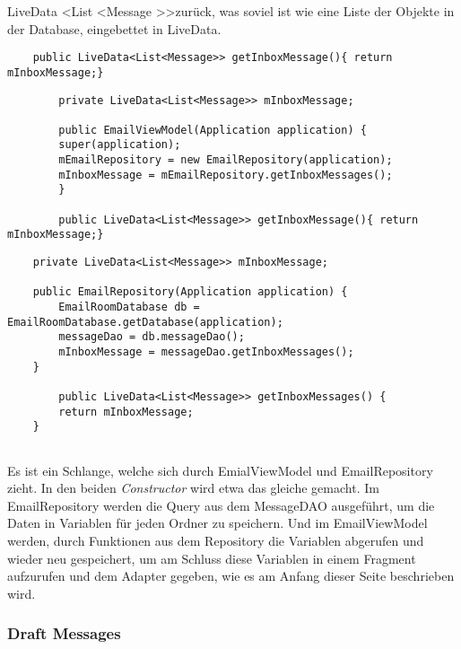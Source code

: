 \documentclass[a4paper,11pt]{article}
\begin{document}
LiveData \textless List \textless Message \textgreater \textgreater  zurück, was soviel ist wie eine Liste der Objekte in der Database, eingebettet 
in LiveData.

\endgroup

\lstset{language=java}
\begin{lstlisting}
    public LiveData<List<Message>> getInboxMessage(){ return mInboxMessage;}

\end{lstlisting}

\lstset{language=java}
\begin{lstlisting}
        private LiveData<List<Message>> mInboxMessage;

        public EmailViewModel(Application application) {
        super(application);
        mEmailRepository = new EmailRepository(application);
        mInboxMessage = mEmailRepository.getInboxMessages();
        }

        public LiveData<List<Message>> getInboxMessage(){ return mInboxMessage;}

\end{lstlisting}

\lstset{language=java}
\begin{lstlisting}
    private LiveData<List<Message>> mInboxMessage;

    public EmailRepository(Application application) {
        EmailRoomDatabase db = EmailRoomDatabase.getDatabase(application);
        messageDao = db.messageDao();
        mInboxMessage = messageDao.getInboxMessages();
    }

        public LiveData<List<Message>> getInboxMessages() {
        return mInboxMessage;
    }


\end{lstlisting}

Es ist ein Schlange, welche sich durch EmialViewModel und EmailRepository zieht. In den beiden \textit{Constructor} wird etwa das gleiche gemacht. Im EmailRepository
werden die Query aus dem MessageDAO ausgeführt, um die Daten in Variablen für jeden Ordner zu speichern. Und im EmailViewModel werden, durch Funktionen aus dem Repository 
die Variablen abgerufen und wieder neu gespeichert, um am Schluss diese Variablen in einem Fragment aufzurufen und dem Adapter gegeben, wie es am Anfang dieser Seite beschrieben 
wird.

\subsubsection{Draft Messages}
\end{document}
